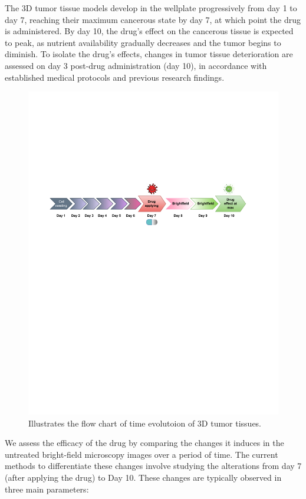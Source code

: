 The 3D tumor tissue models develop in the wellplate progressively from day 1 to day 7, reaching their maximum cancerous state by day 7, at which point the drug is administered. By day 10, the drug's effect on the cancerous tissue is expected to peak, as nutrient availability gradually decreases and the tumor begins to diminish. To isolate the drug's effects, changes in tumor tissue deterioration are assessed on day 3 post-drug administration (day 10),  in accordance with established medical protocols and previous research findings.
\begin{figure}[H]
  \centering
  \includegraphics[scale=0.9]{figures/timed.pdf} 
  \caption{Illustrates the flow chart of time evolutoion of 3D tumor tissues.}
  \label{fig:time}
\end{figure}

We assess the efficacy of the drug by comparing the changes it induces in the untreated bright-field microscopy images over a period of time. The current methods to differentiate these changes involve studying the alterations from day 7 (after applying the drug) to Day 10. These changes are typically observed in three main parameters: 

